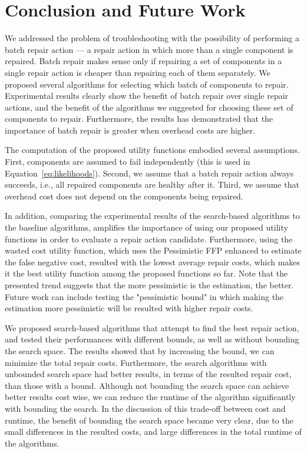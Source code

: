 \documentclass[review]{elsarticle}
\begin{document}
\section{Conclusion and Future Work}

We addressed the problem of troubleshooting with the possibility of performing a batch repair action --- a repair action in which more than a single component is repaired. Batch repair makes sense only if repairing a set of components in a single repair action is cheaper than repairing each of them separately. We proposed several algorithms for selecting which batch of components to repair. Experimental results clearly show the benefit of batch repair over single repair actions, and the benefit of the algorithms we suggested for choosing these set of components to repair. Furthermore, the results has demonstrated that the importance of batch repair is greater when overhead costs are higher.  

The computation of the proposed utility functions embodied several assumptions. First, components are assumed to fail independently (this is used in Equation~\ref{eq:likelihoods}). Second, we assume that a batch repair action always succeeds, i.e., all repaired components are healthy after it. Third, we assume that overhead cost does not depend on the components being repaired. 


In addition, comparing the experimental results of the search-based algorithms to the baseline algorithms, amplifies the importance of using our proposed utility functions in order to evaluate a repair action candidate. Furthermore, using the wasted cost utility function, which uses the Pessimistic FFP enhanced to estimate the false negative cost, resulted with the lowest average repair costs, which makes it the best utility function among the proposed functions so far. Note that the presented trend suggests that the more pessimistic is the estimation, the better. Future work can include testing the "pessimistic bound" in which making the estimation more pessimistic will be resulted with higher repair costs. 



We proposed search-based algorithms that attempt to find the best repair action, and tested their performances with different bounds, as well as without bounding the search space. The results showed that by increasing the bound, we can minimize the total repair costs. 
Furthermore, the search algorithms with unbounded search space had better results, in terms of the resulted repair cost, than those with a bound. Although not bounding the search space can achieve better results cost wise, we can reduce the runtime of the algorithm significantly with bounding the search. In the discussion of this trade-off between cost and runtime, the benefit of bounding the search space became very clear, due to the small differences in the resulted costs, and large differences in the total runtime of the algorithms. 
\end{document}
